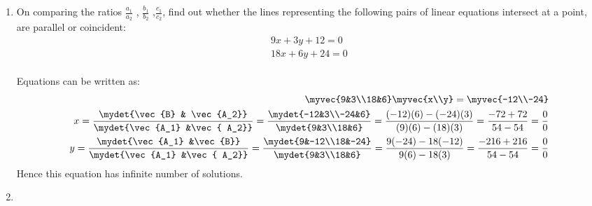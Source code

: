 %
%
\renewcommand{\theequation}{\theenumi}
\begin{enumerate}[label=\thechapter.\arabic*.,ref=\thechapter.\theenumi]
\item On comparing the ratios $\frac{a_1}{a_2}$ , $\frac{b_1}{b_2}$ ,$\frac{c_1}{c_2}$, find out whether the lines representing the following pairs of linear equations intersect at a point, are parallel or coincident:\\
\begin{align}
9x+3y+12=0\\
18x+6y+24=0
\end{align}
\solution \\
Equations can be written as:\\
\begin{align}
\myvec{9&3\\18&6} \myvec{x\\y}= \myvec{-12\\-24}\\
 x= \frac{{\mydet{\vec{B} & \vec{A_2}}}}{\mydet{\vec{A_1} &\vec{ A_2}}}
=\frac{\mydet{-12&3\\-24&6}}{\mydet{9&3\\18&6}}
=\frac{{(-12)(6) - (-24)(3)}}{{(9)(6) - (18)(3)}}
=\frac{-72+72}{54-54}
=\frac{0}{0}\\ 
 y= \frac{{\mydet{\vec{A_1} &\vec{B}}}}{\mydet{\vec{A_1} &\vec{ A_2}}}
=\frac{\mydet{9&-12\\18&-24}}{\mydet{9&3\\18&6}}
=\frac{9(-24) - 18(-12)}{9(6) -18 (3)}
=\frac{-216+216}{54-54}
=\frac{0}{0}
\end{align}
Hence this equation has infinite number of solutions.
\item
\end{enumerate}

